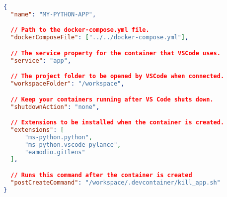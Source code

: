 
\begin{lstlisting}[language=json,caption={\ac{VSCode}s Remote Container \code{devcontainer.json} Configuration File},breaklines=true,label={code::devcontainer_json}]
{
  "name": "MY-PYTHON-APP",

  // Path to the docker-compose.yml file.
  "dockerComposeFile": ["../../docker-compose.yml"],

  // The service property for the container that VSCode uses.
  "service": "app",

  // The project folder to be opened by VSCode when connected.
  "workspaceFolder": "/workspace",

  // Keep your containers running after VS Code shuts down.
  "shutdownAction": "none",

  // Extensions to be installed when the container is created.
  "extensions": [
      "ms-python.python",
      "ms-python.vscode-pylance",
      "eamodio.gitlens"
  ],

  // Runs this command after the container is created
  "postCreateCommand": "/workspace/.devcontainer/kill_app.sh"
}


\end{lstlisting}
